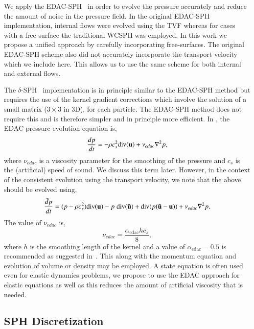 We apply the EDAC-SPH~\citep{edac-sph:cf:2019} in order to evolve the pressure
accurately and reduce the amount of noise in the pressure field. In the
original EDAC-SPH implementation, internal flows were evolved using the TVF
whereas for cases with a free-surface the traditional WCSPH was employed. In
this work we propose a unified approach by carefully incorporating
free-surfaces. The original EDAC-SPH scheme also did not accurately
incorporate the transport velocity which we include here. This allows us to
use the same scheme for both internal and external flows.

The $\delta$-SPH~\citep{antuono-deltasph:cpc:2010} implementation is in
principle similar to the EDAC-SPH method but requires the use of the kernel
gradient corrections which involve the solution of a small matrix ($3 \times
3$ in 3D), for each particle. The EDAC-SPH method does not require this and is
therefore simpler and in principle more efficient. In \citep{edac-sph:cf:2019},
the EDAC pressure evolution equation is,
\begin{equation}
  \label{eq:edac-p-evolve-orig}
     \frac{d p}{d t} = -\rho c_s^2 \text{div}(\mathbf{u}) + \nu_{edac}  \nabla^2 p,
\end{equation}
where $\nu_{edac}$ is a viscosity parameter for the smoothing of the pressure
and $c_s$ is the (artificial) speed of sound. We discuss this term later.
However, in the context of the consistent evolution using the transport
velocity, we note that the above should be evolved using,
\begin{equation}
  \label{eq:edac-p-evolve}
  \frac{\tilde{d} p}{d t} =
  (p -\rho c_s^2)
    \text{div}(\mathbf{u})
  - p \; \text{div}(\tilde{\mathbf{u}})
    + \text{div}(p (\tilde{\mathbf{u}} - \mathbf{u}))
    + \nu_{edac}  \nabla^2 p.
\end{equation}
%
The value of $\nu_{edac}$ is,
\begin{equation}
  \label{eq:nu-edac}
  \nu_{edac} = \frac{\alpha_{\textrm{edac}} h c_s}{8},
\end{equation}
where $h$ is the smoothing length of the kernel and a value of
$\alpha_{\textrm{edac}}=0.5$ is recommended as suggested in~\citep{PRKP:edac-sph-iccm2015}.
This along with the momentum equation and evolution of volume or density may
be employed. A state equation is often used even for elastic dynamics
problems, we propose to use the EDAC approach for elastic equations as well as
this reduces the amount of artificial viscosity that is needed.


\subsection{SPH Discretization}\label{sec:ctvf-sph-equations}

